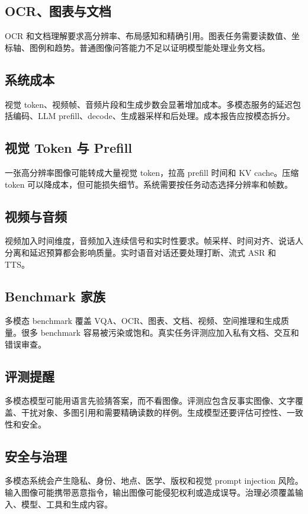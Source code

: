 \documentclass[UTF8,zihao=-4,openany]{ctexbook}
\begin{document}
\subsection{OCR、图表与文档}
OCR 和文档理解要求高分辨率、布局感知和精确引用。图表任务需要读数值、坐标轴、图例和趋势。普通图像问答能力不足以证明模型能处理业务文档。

\subsection{系统成本}
视觉 token、视频帧、音频片段和生成步数会显著增加成本。多模态服务的延迟包括编码、LLM prefill、decode、生成器采样和后处理。成本报告应按模态拆分。

\subsection{视觉 Token 与 Prefill}
一张高分辨率图像可能转成大量视觉 token，拉高 prefill 时间和 KV cache。压缩 token 可以降成本，但可能损失细节。系统需要按任务动态选择分辨率和帧数。

\subsection{视频与音频}
视频加入时间维度，音频加入连续信号和实时性要求。帧采样、时间对齐、说话人分离和延迟预算都会影响质量。实时语音对话还要处理打断、流式 ASR 和 TTS。

\subsection{Benchmark 家族}
多模态 benchmark 覆盖 VQA、OCR、图表、文档、视频、空间推理和生成质量。很多 benchmark 容易被污染或饱和。真实任务评测应加入私有文档、交互和错误审查。

\subsection{评测提醒}
多模态模型可能用语言先验猜答案，而不看图像。评测应包含反事实图像、文字覆盖、干扰对象、多图引用和需要精确读数的样例。生成模型还要评估可控性、一致性和安全。

\subsection{安全与治理}
多模态系统会产生隐私、身份、地点、医学、版权和视觉 prompt injection 风险。输入图像可能携带恶意指令，输出图像可能侵犯权利或造成误导。治理必须覆盖输入、模型、工具和生成内容。
\end{document}
